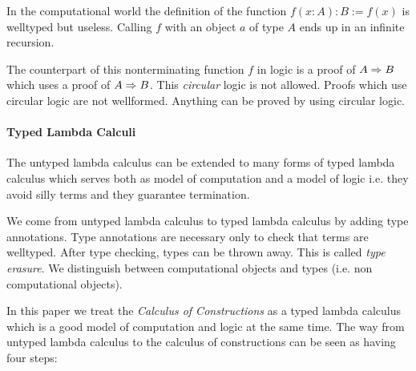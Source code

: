 In the computational world the definition of the function $f(x: A): B := f(x)$
is welltyped but useless. Calling $f$ with an object $a$ of type $A$ ends up in
an infinite recursion.

The counterpart of this nonterminating function $f$ in logic is a proof of $A
\Rightarrow B$ which uses a proof of $A \Rightarrow B$. This \emph{circular} logic is not
allowed. Proofs which use circular logic are not wellformed. Anything can be
proved by using circular logic.




\paragraph{Typed Lambda Calculi}
The untyped lambda calculus can be extended to many forms of typed lambda
calculus which serves both as model of computation and a model of logic i.e.
they avoid silly terms and they guarantee termination.

We come from untyped lambda calculus to typed lambda calculus by adding type
annotations. Type annotations are necessary only to check that terms are
welltyped. After type checking, types can be thrown away. This is called
\emph{type erasure}. We distinguish between computational objects and types
(i.e. non computational objects).

In this paper we treat the \emph{Calculus of Constructions} as a typed
lambda calculus which is a good model of computation and logic at the same time.
The way from untyped lambda calculus to the calculus of constructions can be
seen as having four steps:

